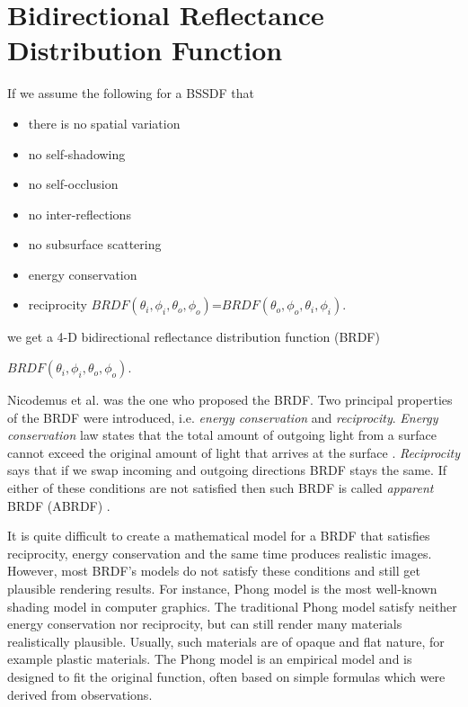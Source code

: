 \section{Bidirectional Reflectance Distribution Function}
\label{section:brdf}

If we assume the following for a BSSDF that

\begin{itemize}
 \item there is no spatial variation 
 \item no self-shadowing
 \item no self-occlusion
 \item no inter-reflections
 \item no subsurface scattering
 \item energy conservation
 \item reciprocity  $BRDF(\theta_{i} ,\phi_{i},\theta_{o} ,\phi_{o})$=$BRDF(\theta_{o} ,\phi_{o},\theta_{i} ,\phi_{i})$.
\end{itemize}

 we get a 4-D bidirectional reflectance distribution function (BRDF)
 \begin{center}
$BRDF(\theta_{i} ,\phi_{i},\theta_{o} ,\phi_{o})$.
 \end{center}
Nicodemus et al. \cite{Nicodemus} was the one who proposed the BRDF. 
Two principal properties of the BRDF were introduced, i.e. \emph{energy conservation} and \emph{reciprocity}. 
\emph{Energy conservation} law states that the total amount of outgoing light from a surface cannot exceed the
original amount of light that arrives at the surface \cite{wynn}. 
 \emph{Reciprocity} says that if we swap incoming and outgoing directions BRDF stays the same.
If either of these conditions are not satisfied then such BRDF is called \emph{apparent} BRDF (ABRDF) \cite{abrdf}.

It is quite difficult to create a mathematical model for a BRDF that satisfies reciprocity,
energy conservation and the same time produces realistic images. However, most BRDF's models do not satisfy these conditions and still get plausible rendering results.
For instance, Phong model is the most well-known shading model in computer graphics. 
The traditional Phong model satisfy neither energy conservation nor reciprocity, but can still render many materials realistically plausible.
Usually, such materials are of opaque and flat nature, for example plastic materials.
The Phong model is an empirical model and is designed to fit the original function, often based on simple formulas which were derived from observations.


